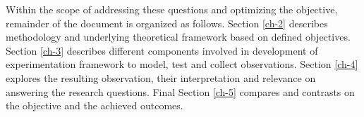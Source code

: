 \begin{large}
Within the scope of addressing these questions and optimizing the objective, remainder of the document is organized as follows. Section \ref{ch-2} describes methodology and underlying theoretical framework based on defined objectives. Section \ref{ch-3} describes different components involved in development of experimentation framework to model, test and collect observations. Section \ref{ch-4} explores the resulting observation, their interpretation and relevance on answering the research questions. Final Section \ref{ch-5} compares and contrasts on the objective and the achieved outcomes. \\

\end{large}
